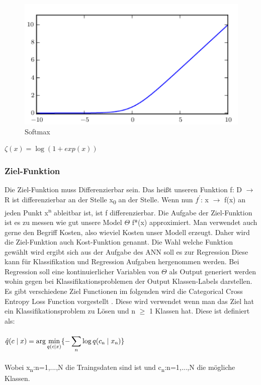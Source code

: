 \documentclass{llncs}
\begin{document}
\begin{figure}[htbp] 
	\centering
	\includegraphics[width=1.0\textwidth]{softmax.png}
	\caption{Softmax}
	\label{fig:Bild1}
\end{figure}

\begin{math}
\zeta(x) = \log(1+exp(x))
\end{math}

\newpage

\subsubsection[short title]{Ziel-Funktion}

Die Ziel-Funktion muss Differenzierbar sein. Das heißt unseren Funktion f: D $\to$ R ist differenzierbar an der Stelle x\textsubscript{0} an der Stelle. Wenn nun $f^\prime$: x $\to$ f(x) an jeden Punkt x\textsuperscript{n} ableitbar ist, ist f differenzierbar. Die Aufgabe der Ziel-Funktion ist es zu messen wie gut unsere Model $\Theta$ f*(x) approximiert. Man verwendet auch gerne den Begriff Kosten, also wieviel Kosten unser Modell erzeugt. Daher wird die Ziel-Funktion auch Kost-Funktion genannt. Die Wahl welche Funktion gewählt wird ergibt sich aus der Aufgabe des ANN soll es zur Regression Diese kann für Klassifikation und Regression Aufgaben hergenommen werden.   Bei Regression soll eine kontinuierlicher Variablen von $\Theta$ als Output generiert werden wohin gegen bei Klassifikationsproblemen der Output Klassen-Labels darstellen. Es gibt verschiedene Ziel Functionen im folgenden wird die Categorical Cross Entropy Loss Function vorgestellt \cite{crossentropy}. Diese wird verwendet wenn man das Ziel hat ein Klassifikationsproblem zu Lösen und n $\geq$ 1 Klassen hat. Diese ist definiert als:
\\\\
\begin{math}
\hat{q}(c\mid x)=\displaystyle\arg\min_{q(c\mid  x)}\{-\displaystyle\sum_{n}{\log q(c\textsubscript{n}\mid x\textsubscript{n})}\}
\end{math}
\\\\
Wobei  x\textsubscript{n}:n=1,...,N die Traingsdaten sind ist und c\textsubscript{n}:n=1,...,N die mögliche Klassen.
\newpage
\end{document}
